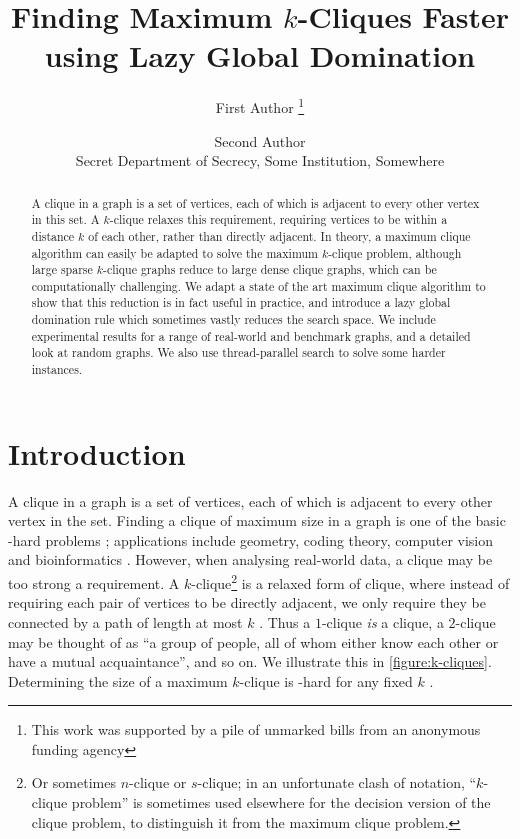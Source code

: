 \documentclass[letterpaper]{article}
\begin{document}
\title{Finding Maximum $k$-Cliques Faster using Lazy Global Domination}
\author{
    First Author%
    \thanks{This work was supported by a pile of unmarked bills from an anonymous funding agency}
    \and
    Second Author
    \\ Secret Department of Secrecy, Some Institution, Somewhere
}
\maketitle

\begin{abstract}
    A clique in a graph is a set of vertices, each of which is adjacent to every other vertex in
    this set. A $k$-clique relaxes this requirement, requiring vertices to be within a distance $k$
    of each other, rather than directly adjacent. In theory, a maximum clique algorithm can easily
    be adapted to solve the maximum $k$-clique problem, although large sparse $k$-clique graphs
    reduce to large dense clique graphs, which can be computationally challenging. We adapt a state of
    the art maximum clique algorithm to show that this reduction is in fact useful in practice, and
    introduce a lazy global domination rule which sometimes vastly reduces the search space. We
    include experimental results for a range of real-world and benchmark graphs, and a detailed look
    at random graphs. We also use thread-parallel search to solve some harder instances.
\end{abstract}

\section{Introduction}

A clique in a graph is a set of vertices, each of which is adjacent to every other vertex in the
set. Finding a clique of maximum size in a graph is one of the basic \NP-hard problems
\cite{Garey:1990}; applications include geometry, coding theory, computer vision and bioinformatics
\cite{Bomze:1999,Butenko:2006}. However, when analysing real-world data, a clique may be too strong
a requirement. A $k$-clique\footnote{Or sometimes $n$-clique or $s$-clique; in an unfortunate clash
of notation, ``$k$-clique problem'' is sometimes used elsewhere for the decision version of the
clique problem, to distinguish it from the maximum clique problem.} is a relaxed form of clique,
where instead of requiring each pair of vertices to be directly adjacent, we only require they be
connected by a path of length at most $k$ \cite{Luce:1950}.  Thus a $1$-clique \emph{is} a clique, a
$2$-clique may be thought of as ``a group of people, all of whom either know each other or have a
mutual acquaintance'', and so on. We illustrate this in \cref{figure:k-cliques}.  Determining the
size of a maximum $k$-clique is \NP-hard for any fixed $k$ \cite{Bourjolly:2002}.
\end{document}
